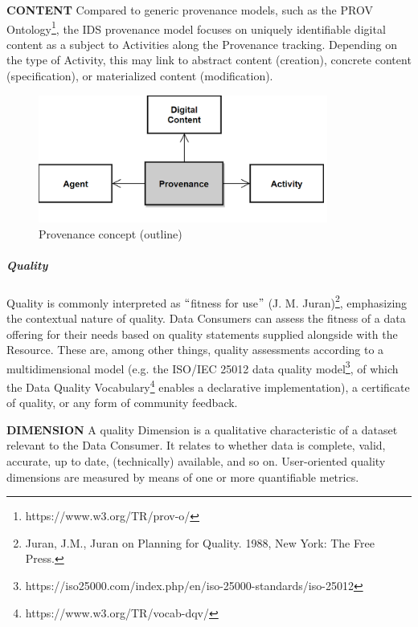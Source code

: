 \textbf{CONTENT} Compared to generic provenance models, such as the PROV Ontology\footnote{ https://www.w3.org/TR/prov-o/ }, the IDS provenance model focuses on uniquely identifiable digital content as a subject to Activities along the Provenance tracking. Depending on the type of Activity, this may link to abstract content (creation), concrete content (specification), or materialized content (modification). 




\begin{figure}[H]
	\begin{Center}
		\includegraphics[width=3.74in,height=1.65in]{./media/image44.png}
		\caption{Provenance concept (outline)}
		\label{fig:Provenance_concept_outline}
	\end{Center}
\end{figure}




\subparagraph*{Quality}
Quality is commonly interpreted as $``$fitness for use$"$  (J. M. Juran)\footnote{Juran, J.M., Juran on Planning for Quality. 1988, New York: The Free Press.  }, emphasizing the contextual nature of quality. Data Consumers can assess the fitness of a data offering for their needs based on quality statements supplied alongside with the Resource. These are, among other things, quality assessments according to a multidimensional model (e.g. the ISO/IEC 25012 data quality model\footnote{https://iso25000.com/index.php/en/iso-25000-standards/iso-25012 }, of which the Data Quality Vocabulary\footnote{https://www.w3.org/TR/vocab-dqv/ } enables a declarative implementation), a certificate of quality, or any form of community feedback.


\textbf{DIMENSION} A quality Dimension is a qualitative characteristic of a dataset relevant to the Data Consumer. It relates to whether data is complete, valid, accurate, up to date, (technically) available, and so on. User-oriented quality dimensions are measured by means of one or more quantifiable metrics. 

